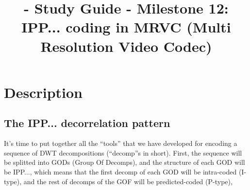 
\title{\SM{} - Study Guide - Milestone 12: IPP... coding in MRVC (Multi Resolution Video Codec)}

\maketitle

\section{Description}

\subsection{The IPP... decorrelation pattern}
It's time to put together all the ``tools'' that we have developed for
encoding a sequence of DWT decompositions (``decomp''s in
short). First, the sequence will be splitted into GODs (Group Of
Decomps), and the structure of each GOD will be IPP..., which means
that the first decomp of each GOD will be intra-coded (I-type), and
the rest of decomps of the GOF will be predicted-coded (P-type),
